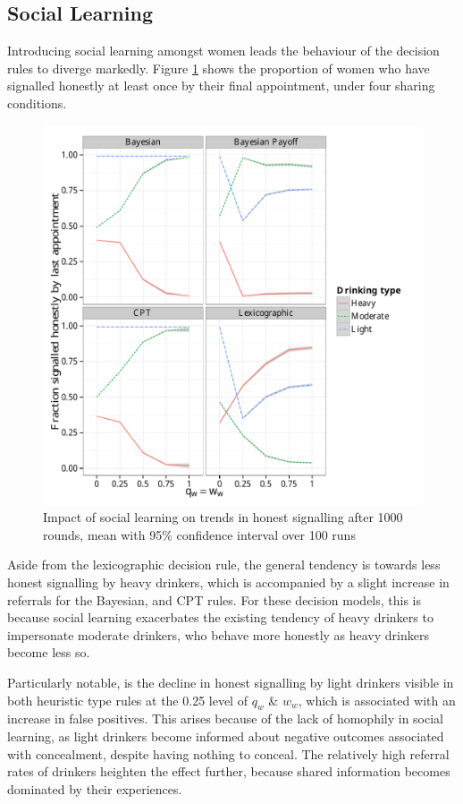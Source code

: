 \subsection{Social Learning}
\label{sub:sharing_results}

Introducing social learning amongst women leads the behaviour of the decision rules to diverge markedly. Figure \ref{fig:honest_sharing} shows the proportion of women who have signalled honestly at least once by their final appointment, under four sharing conditions. 

\begin{figure}
\includegraphics[width=119mm]{figures/honesty_sharing}
\caption{Impact of social learning on trends in honest signalling after 1000 rounds, mean with 95\% confidence interval over 100 runs}
\label{fig:honest_sharing}
\end{figure}

Aside from the lexicographic decision rule, the general tendency is towards less honest signalling by heavy drinkers, which is accompanied by a slight increase in referrals for the Bayesian, and \ac{CPT} rules. For these decision models, this is because social learning exacerbates the existing tendency of heavy drinkers to impersonate moderate drinkers, who behave more honestly as heavy drinkers become less so.

Particularly notable, is the decline in honest signalling by light drinkers visible in both heuristic type rules at the 0.25 level of \(q_{w}\) \& \(w_{w}\), which is associated with an increase in false positives. This arises because of the lack of homophily in social learning, as light drinkers become informed about negative outcomes associated with concealment, despite having nothing to conceal. The relatively high referral rates of drinkers heighten the effect further, because shared information becomes dominated by their experiences. 

